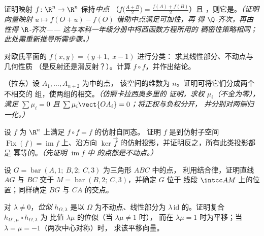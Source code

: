\begin{exercise}[$\star\star$]\label{exo:b2:affine:5}
证明映射 $f \colon \R^n \to \R^n$ 保持\emph{中点}
（$f\bigl(\frac{A+B}{2}\bigr) = \frac{f(A) + f(B)}{2}$）且
\emph{}，则它是。\emph{（证明向量映射 $u \mapsto
f(O + u) - f(O)$ 借助中点满足可加性，再
得 $\Q$-齐次，再由性得 $\R$-齐次——
这与本科一年级分册中柯西函数方程所用的
稠密性策略相同；此处需重新推导所需步骤。）}
\end{exercise}

\begin{exercise}[$\star\star$]\label{exo:b2:affine:6}
对欧氏平面的 $f(x, y) = (y + 1,\; x - 1)$ 进行分类：
求其线性部分、不动点与几何性质
（是反射还是滑反射？）。计算 $f \circ f$，并作出结论。
\end{exercise}

\begin{exercise}[$\star\star\star$]\label{exo:b2:affine:7}
（拉东）设 $A_1, \dots, A_{n+2}$ 为中的点，
该空间的维数为 $n$。证明可将它们分成两个不相交的
组，使两组的相交。\emph{（仿照卡拉西奥多里的
证明，求权 $\mu_i$（不全为零），满足 $\sum\mu_i = 0$ 且
$\sum\mu_i\vect{OA_i} = 0$；将正权与负权分开，
并分别对两侧归一化。）}
\end{exercise}

\begin{exercise}[$\star\star\star$]\label{exo:b2:affine:8}
设 $f$ 为 $\R^n$ 上满足 $f \circ f = f$ 的仿射自同态。
证明 $f$ 是到仿射子空间
$\operatorname{Fix}(f) = \operatorname{im} f$ 上、沿方向
$\ker\vec f$ 的仿射投影，并证明反之，所有此类投影都是
幂等的。\emph{（先证明 $\operatorname{im} f$ 中
的点都是不动点。）}
\end{exercise}

\begin{exercise}[$\star$]\label{exo:b2:affine:9}
设 $G = \operatorname{bar}(A, 1;\ B, 2;\ C, 3)$ 为三角形 $ABC$ 中的点，
利用结合律，证明直线 $AG$ 与 $BC$
交于 $M = \operatorname{bar}(B, 2;\ C, 3)$，并确定 $G$ 位于
线段 $\intcc AM$ 上的位置；同样确定 $BG$
与 $CA$ 的交点。
\end{exercise}

\begin{exercise}[$\star\star$]\label{exo:b2:affine:10}
对 $\lambda \neq 0$，\emph{位似} $h_{\Omega,
\lambda}$ 是以 $\Omega$ 为不动点、线性部分为
$\lambda\,\mathrm{id}$ 的。证明复合
$h_{\Omega', \mu} \circ h_{\Omega, \lambda}$ 为
比值 $\lambda\mu$ 的位似（当 $\lambda\mu \neq 1$ 时），
而在 $\lambda\mu = 1$ 时为平移；当 $\lambda = \mu = -1$（两次中心对称）时，
求该平移向量。
\end{exercise}

